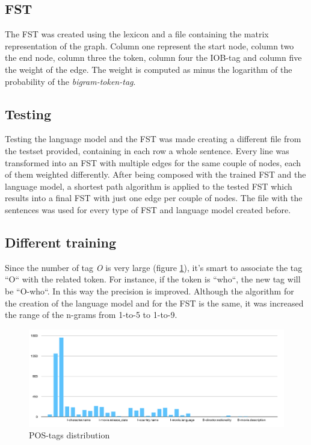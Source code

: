 \documentclass[11pt,a4paper]{article}
\begin{document}
\subsection*{FST}
The FST was created using the lexicon and a file containing the matrix representation of the graph. Column one represent the start node, column two the end node, column three the token, column four the IOB-tag and column five the weight of the edge. The weight is computed as minus the logarithm of the probability of the \textit{bigram-token-tag}.
\subsection*{Testing}
Testing the language model and the FST  was  made creating a different file from the testset provided, containing in each row a whole sentence. Every line was transformed into an FST with multiple edges for the same couple of nodes, each of them weighted differently. After being composed with the trained FST and the language model, a shortest path algorithm is applied to the tested FST which results into a final FST with just one edge per couple of nodes. The file with the sentences was used for every type of FST and language model created before. 

\subsection*{Different training}
Since the number of tag \textit{O} is very large (figure \ref{fig:pos}), it's smart to associate the tag ``O`` with the related token. For instance, if the token is ``who``, the new tag will be ``O-who``. In this way the precision is improved. Although the algorithm for the creation of the language model and for the FST is the same, it was increased the range of the n-grams from 1-to-5 to 1-to-9.

\begin{figure}[ht]
  \includegraphics[width=\linewidth]{img/pos.png}
  \caption{POS-tags distribution}
  \label{fig:pos}
\end{figure}
\end{document}
